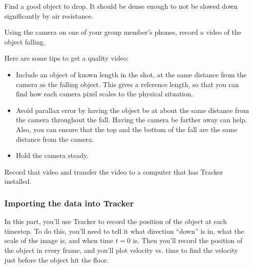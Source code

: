 \begin{steps}
	\item Find a good object to drop. It should be dense enough to not be slowed down significantly by air resistance.
	
	\item Using the camera on one of your group member's phones, record a video of the object falling.
	
	Here are some tips to get a quality video:
	\begin{itemize}
		\item Include an object of known length in the shot, at the same distance from the camera as the falling object. This gives a reference length, so that you can find how each camera pixel scales to the physical situation.
		
		\item Avoid parallax error by having the object be at about the same distance from the camera throughout the fall. Having the camera be farther away can help. Also, you can ensure that the top and the bottom of the fall are the same distance from the camera.
		
		\item Hold the camera steady.
	\end{itemize}
	
	\item Record that video and transfer the video to a computer that has Tracker installed.
\end{steps}

\subsubsection{Importing the data into Tracker}

In this part, you'll use Tracker to record the position of the object at each timestep. To do this, you'll need to tell it what direction ``down'' is in, what the scale of the image is, and when time $t=0$ is. Then you'll record the position of the object in every frame, and you'll plot velocity vs. time to find the velocity just before the object hit the floor.

